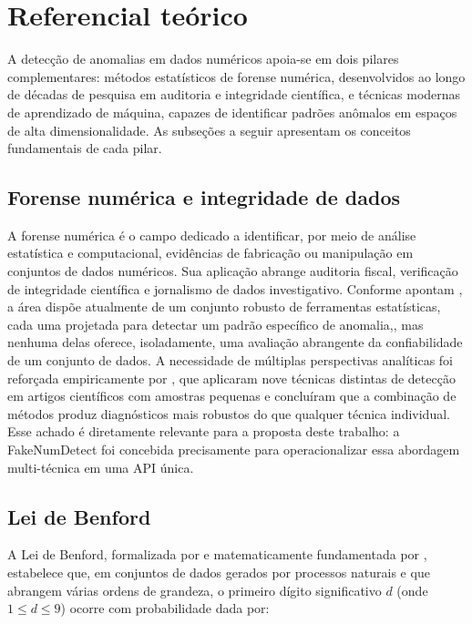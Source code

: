\documentclass[
    12pt,                %
    openright,           %
    oneside,             %
    a4paper,             %
    english,             %
    brazil               %
]{abntex2}
\begin{document}
\section{Referencial teórico}
\label{sec:referencial}

A detecção de anomalias em dados numéricos apoia-se em dois pilares complementares: métodos estatísticos de forense numérica, desenvolvidos ao longo de décadas de pesquisa em auditoria e integridade científica, e técnicas modernas de aprendizado de máquina, capazes de identificar padrões anômalos em espaços de alta dimensionalidade. As subseções a seguir apresentam os conceitos fundamentais de cada pilar.

\subsection{Forense numérica e integridade de dados}

A forense numérica é o campo dedicado a identificar, por meio de análise estatística e computacional, evidências de fabricação ou manipulação em conjuntos de dados numéricos. Sua aplicação abrange auditoria fiscal, verificação de integridade científica e jornalismo de dados investigativo. Conforme apontam , a área dispõe atualmente de um conjunto robusto de ferramentas estatísticas, cada uma projetada para detectar um padrão específico de anomalia,, mas nenhuma delas oferece, isoladamente, uma avaliação abrangente da confiabilidade de um conjunto de dados.
A necessidade de múltiplas perspectivas analíticas foi reforçada empiricamente por , que aplicaram nove técnicas distintas de detecção em artigos científicos com amostras pequenas e concluíram que a combinação de métodos produz diagnósticos mais robustos do que qualquer técnica individual. Esse achado é diretamente relevante para a proposta deste trabalho: a FakeNumDetect foi concebida precisamente para operacionalizar essa abordagem multi-técnica em uma API única.

\subsection{Lei de Benford}

A Lei de Benford, formalizada por  e matematicamente fundamentada por , estabelece que, em conjuntos de dados gerados por processos naturais e que abrangem várias ordens de grandeza, o primeiro dígito significativo \(d\) (onde \(1 \leq d \leq 9\)) ocorre com probabilidade dada por:
\end{document}
